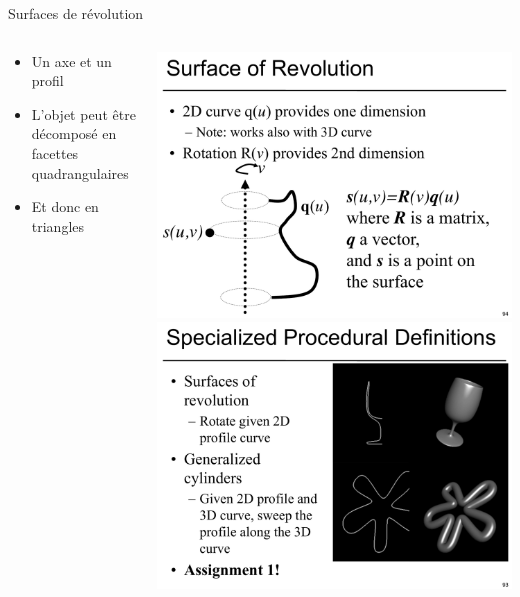 \begin{frame}{Surfaces de révolution}
\begin{columns}
\begin{column}{.6\textwidth}
\begin{itemize}
\item Un axe et un profil
\item L'objet peut être décomposé en facettes quadrangulaires
\item Et donc en triangles
\end{itemize}
\end{column}
\begin{column}{.39\textwidth}
\includegraphics[height=.4\textheight]{figs/rev2.pdf} \\
\includegraphics[height=.4\textheight]{figs/rev1.pdf}
\end{column}
\end{columns}
\end{frame}

